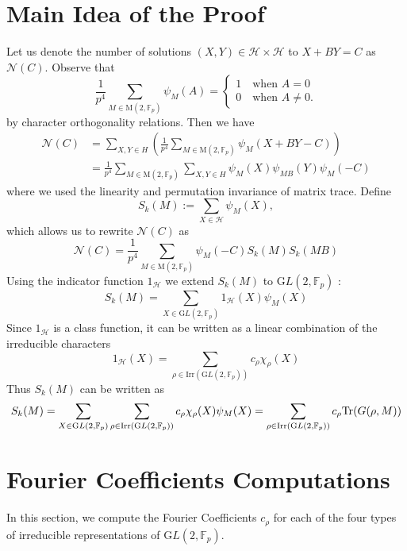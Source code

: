 \documentclass[12pt,reqno]{amsart}
\theoremstyle{plain}
\theoremstyle{definition}
\newcommand{\Tr}{{\rm Tr}}
\newcommand{\GL}{{\mathrm GL}}
\newcommand{\M}{\mathrm{M}}
\newcommand{\irr}{\mathrm{Irr}}
\newcommand{\sH}{{\mathcal H}}
\newcommand{\sN}{{\mathcal N}}
\theoremstyle{remark}
\newcommand{\FF}{\mathbb{F}}
\begin{document}
\section{Main Idea of the Proof}\label{sec: main idea of proof}
Let us denote the number of solutions $(X,Y) \in \sH \times \sH$ to $X+BY=C$ as $\sN(C).$ Observe that $$\frac{1}{p^4}\sum_{M \in \M(2, \FF_p)}\psi_M(A)= \begin{cases}
    1 \quad \text{when~} A =0\\
    0 \quad \text{when~} A \neq 0.
\end{cases}$$ by character orthogonality relations. Then we have  
\begin{align*}
    \sN (C) &= \sum_{X,Y \in H}\left( \frac{1}{p^4} \sum_{M \in \M(2, \FF_p)}\psi_M(X+BY-C)\right)\\ &=  \frac{1}{p^4} \sum_{M \in \M(2, \FF_p)} \sum_{X,Y \in H}\psi_M(X)  \psi_{MB} (Y)  \psi_M(-C)
\end{align*}
where we used the linearity and permutation invariance of matrix trace. Define $$S_k(M):= \sum\limits_{X \in \sH} \psi_M(X),$$ which allows us to rewrite $\sN(C)$ as 
\begin{equation}\label{eq: N(C) formula}
    \sN(C)= \frac{1}{p^4} \sum_{M \in \M(2, \FF_p)} \psi_M(-C)S_k(M) S_k(MB)
\end{equation}
Using the indicator function $1_{\sH}$ we extend $S_k(M)$ to $\GL(2, \FF_p)$ : $$S_k(M) = \sum_{X \in \GL(2, \FF_p)} 1_{\sH}(X)\psi_M(X)$$
Since $1_{\sH}$ is a class function, it can be written as a linear combination of the irreducible characters $$1_{\sH} (X)= \sum_{\rho \in \irr(\GL(2, \FF_p))}  c_{\rho} \chi_{\rho}(X)$$
Thus $S_k(M)$ can be written as 
\begin{equation}
\label{Eq:S_k(M)} S_k(M) = \sum_{X \in \GL(2, \FF_p)}\sum_{\rho \in \irr(\GL(2, \FF_p))}  c_{\rho} \chi_{\rho}(X)\psi_M(X)= \sum_{\rho\in \irr(\GL(2, \FF_p))}c_{\rho}\Tr(G(\rho,M)) 
\end{equation}
\section{Fourier Coefficients Computations}\label{sec: computing Fourier coeff}
In this section, we compute the Fourier Coefficients $c_{\rho}$ for each of the four types of irreducible representations of $\GL(2, \FF_p).$
\end{document}
